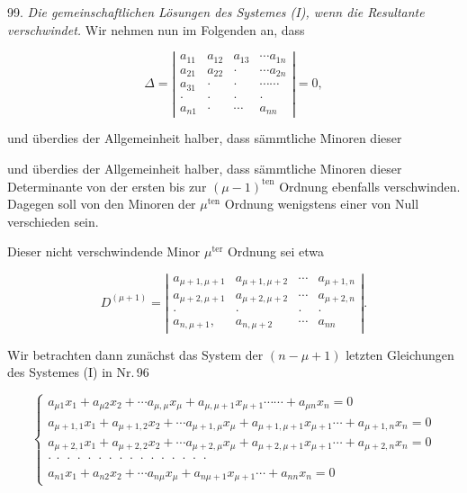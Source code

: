 \documentclass[11pt]{article}
\providecommand{\weberpage}[1]{}
\providecommand{\weq}[2]{\begin{equation}\tag{#1}#2\end{equation}}
\let\Delta\varDelta
\begin{document}
99. \textit{Die gemeinschaftlichen Lösungen des Systemes (I), wenn die
Resultante verschwindet.} Wir nehmen nun im Folgenden an, dass

\[
\Delta=
\left|
\begin{array}{cccc}
a_{11} & a_{12} & a_{13} & \cdots a_{1n}\\
a_{21} & a_{22} & \cdot & \cdots a_{2n}\\
a_{31} & \cdot & \cdot & \cdots\cdots\\
\cdot & \cdot & \cdot & \cdot\\
a_{n1} & \cdot & \cdots & a_{nn}
\end{array}
\right|=0,
\]

und überdies der Allgemeinheit halber, dass sämmtliche Minoren dieser


\weberpage{104}
und überdies der Allgemeinheit halber, dass sämmtliche Minoren dieser
Determinante von der ersten bis zur $(\mu-1)^{\text{ten}}$ Ordnung
ebenfalls verschwinden. Dagegen soll von den Minoren der
$\mu^{\text{ten}}$ Ordnung wenigstens einer von Null verschieden sein.

Dieser nicht verschwindende Minor $\mu^{\text{ter}}$ Ordnung sei etwa

\[
D^{(\mu+1)}=
\left|
\begin{array}{cccc}
a_{\mu+1,\mu+1} & a_{\mu+1,\mu+2} & \cdots & a_{\mu+1,n}\\
a_{\mu+2,\mu+1} & a_{\mu+2,\mu+2} & \cdots & a_{\mu+2,n}\\
\cdot & \cdot & \cdot & \cdot\\
a_{n,\mu+1}, & a_{n,\mu+2} & \cdots & a_{nn}
\end{array}
\right|.
\]

Wir betrachten dann zunächst das System der $(n-\mu+1)$ letzten
Gleichungen des Systemes (I) in Nr.\,96

\weq{III}{\left\{\begin{array}{l}
a_{\mu1}x_1+a_{\mu2}x_2+\cdots a_{\mu,\mu}x_\mu+a_{\mu,\mu+1}x_{\mu+1}\cdots\cdots+a_{\mu n}x_n=0\\
a_{\mu+1,1}x_1+a_{\mu+1,2}x_2+\cdots a_{\mu+1,\mu}x_\mu+a_{\mu+1,\mu+1}x_{\mu+1}\cdots+a_{\mu+1,n}x_n=0\\
a_{\mu+2,1}x_1+a_{\mu+2,2}x_2+\cdots a_{\mu+2,\mu}x_\mu+a_{\mu+2,\mu+1}x_{\mu+1}\cdots+a_{\mu+2,n}x_n=0\\
\cdot\ \cdot\ \cdot\ \cdot\ \cdot\ \cdot\ \cdot\ \cdot\ \cdot\ \cdot\ \cdot\ \cdot\ \cdot\ \cdot\ \cdot\ \cdot\\
a_{n1}x_1+a_{n2}x_2+\cdots a_{n\mu}x_\mu+a_{n\mu+1}x_{\mu+1}\cdots+a_{nn}x_n=0
\end{array}\right.}
\end{document}
